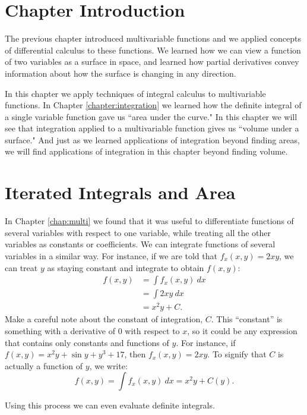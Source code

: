 \iflatexml\section*{Chapter Introduction}\fi

The previous chapter introduced multivariable functions and we applied concepts of differential calculus to these functions. We learned how we can view a function of two variables as a surface in space, and learned how partial derivatives convey  information about how the surface is changing in any direction.

In this chapter we apply techniques of integral calculus to multivariable functions. In Chapter \ref{chapter:integration} we learned how the definite integral of a single variable function gave us ``area under the curve." In this chapter we will see that integration applied to a multivariable function gives us ``volume under a surface." And just as we learned applications of integration beyond finding areas, we will find applications of integration in this chapter beyond finding volume.

\section{Iterated Integrals and Area}\label{sec:iterated_integrals}

In Chapter \ref{chap:multi} we found that it was useful to differentiate functions of several variables with respect to one variable, while treating all the other variables as constants or coefficients. We can integrate functions of several variables in a similar way. For instance, if we are told that $f_x(x,y) = 2xy$, we can treat $y$ as staying constant and integrate to obtain $f(x,y)$:
\begin{align*}
f(x,y) &= \int f_x(x,y)\ dx\\
				&= \int 2xy\ dx \\
				&= x^2y + C.
\end{align*}
Make a careful note about the constant of integration, $C$. This ``constant'' is something with a derivative of $0$ with respect to $x$, so it could be any expression that contains only constants and functions of $y$. For instance, if $f(x,y) = x^2y+ \sin y + y^3 + 17$, then $f_x(x,y) = 2xy$. To signify that $C$ is actually a function of $y$, we write:
$$f(x,y) = \int f_x(x,y)\ dx  = x^2y+C(y).$$

Using this process we can even evaluate definite integrals.\\

